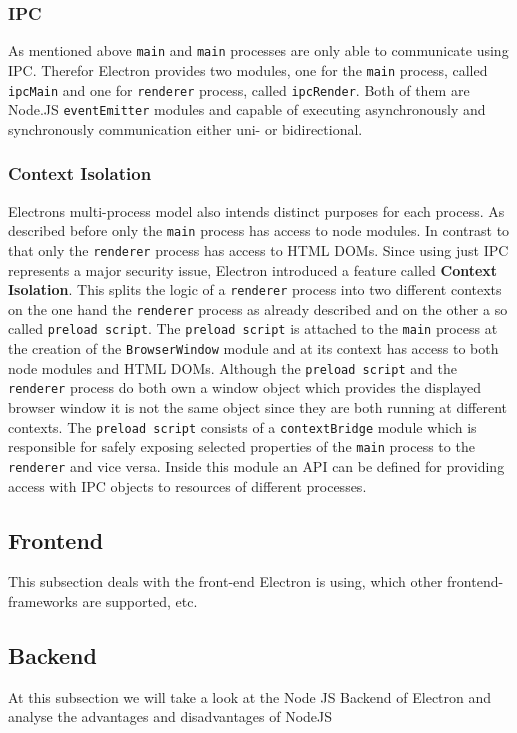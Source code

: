 \subsubsection{IPC}
As mentioned above \texttt{main} and \texttt{main} processes are only able to communicate using \ac{IPC}.
Therefor Electron provides two modules, one for the \texttt{main} process, called \texttt{ipcMain} and one for \texttt{renderer} process, called \texttt{ipcRender}.
Both of them are Node.JS \texttt{eventEmitter} modules and capable of executing asynchronously and synchronously communication either uni- or bidirectional.

\subsubsection{Context Isolation}
Electrons multi-process model also intends distinct purposes for each process.
As described before only the \texttt{main} process has access to node modules.
In contrast to that only the \texttt{renderer} process has access to \ac{HTML} \ac{DOM}s.
Since using just \ac{IPC} represents a major security issue, Electron introduced a feature called \textbf{Context Isolation}.
This splits the logic of a \texttt{renderer} process into two different contexts on the one hand the \texttt{renderer} process as already described and on the other a so called \texttt{preload script}.
The \texttt{preload script} is attached to the \texttt{main} process at the creation of the \texttt{BrowserWindow} module and at its context has access to both node modules and \ac{HTML} \ac{DOM}s.
Although the \texttt{preload script} and the \texttt{renderer} process do both own a window object which provides the displayed browser window it is not the same object since they are both running at
different contexts.
The \texttt{preload script} consists of a \texttt{contextBridge} module which is responsible for safely exposing selected properties of the \texttt{main} process to the \texttt{renderer} and vice versa.
Inside this module an \ac{API} can be defined for providing access with \ac{IPC} objects to resources of different processes.


\subsection{Frontend}
\label{subsec:electron:frontend}
This subsection deals with the front-end Electron is using, which other frontend-frameworks are supported, etc.

\subsection{Backend}
\label{subsec:electron:backend}
At this subsection we will take a look at the Node JS Backend of Electron and analyse the advantages and disadvantages of NodeJS